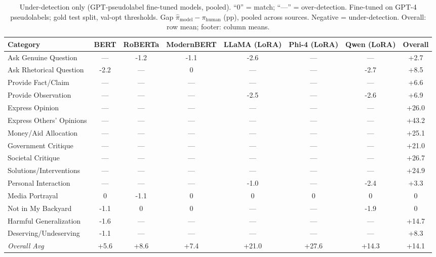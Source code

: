 \begin{table}[htbp]
\centering
\begin{tabular}{lccccccc}
\toprule
Category & BERT & RoBERTa & ModernBERT & LLaMA (LoRA) & Phi-4 (LoRA) & Qwen (LoRA) & Overall \\
\midrule
Ask Genuine Question & --- & -1.2 & -1.1 & -2.6 & --- & --- & +2.7 \\
Ask Rhetorical Question & -2.2 & --- & 0 & --- & --- & -2.7 & +8.5 \\
Provide Fact/Claim & --- & --- & --- & --- & --- & --- & +6.6 \\
Provide Observation & --- & --- & --- & -2.5 & --- & -2.6 & +6.9 \\
Express Opinion & --- & --- & --- & --- & --- & --- & +26.0 \\
Express Others' Opinions & --- & --- & --- & --- & --- & --- & +43.2 \\
Money/Aid Allocation & --- & --- & --- & --- & --- & --- & +25.1 \\
Government Critique & --- & --- & --- & --- & --- & --- & +21.0 \\
Societal Critique & --- & --- & --- & --- & --- & --- & +26.7 \\
Solutions/Interventions & --- & --- & --- & --- & --- & --- & +24.9 \\
Personal Interaction & --- & --- & --- & -1.0 & --- & -2.4 & +3.3 \\
Media Portrayal & 0 & -1.1 & 0 & 0 & 0 & 0 & 0 \\
Not in My Backyard & -1.1 & 0 & 0 & --- & --- & -1.9 & 0 \\
Harmful Generalization & -1.6 & --- & --- & --- & --- & --- & +14.7 \\
Deserving/Undeserving & -1.1 & --- & --- & --- & --- & --- & +8.3 \\
\midrule
\textit{Overall Avg} & +5.6 & +8.6 & +7.4 & +21.0 & +27.6 & +14.3 & +14.1 \\
\bottomrule
\end{tabular}
\caption{Under-detection only (GPT-pseudolabel fine-tuned models, pooled). ``0'' = match; ``---'' = over-detection. Fine-tuned on GPT-4 pseudolabels; gold test split, val-opt thresholds. Gap $\hat{\pi}_{\mathrm{model}}-\pi_{\mathrm{human}}$ (pp), pooled across sources. Negative = under-detection. Overall: row mean; footer: column means.}
\label{tab:finetuned_pseudolabel_negative_only_pooled}
\end{table}
